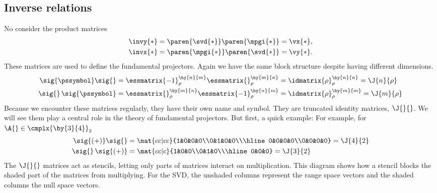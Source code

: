 \subsection{Inverse relations}
No consider the product matrices
\begin{equation}
  \begin{split}
    \invy{*} = \paren{ \svd{*} } \paren{ \mpgi{*} } = \vx{*},\\
    \invx{*} = \paren{ \mpgi{*} }\paren{ \svd{*} }  = \vy{*}.\\
  \end{split}
\end{equation}
These matrices are used to define the fundamental projectors. Again we have the same block structure despite having different dimensions.
\begin{equation}
  \begin{split}
  \sig{\pssymbol}\sig{} &= 
  \essmatrix{-1}^{\by{n}{m}}_{\rho} 
  \essmatrix{}^{\by{m}{n}}_{\rho} = 
  \idmatrix{\rho}^{\by{n}{n}}_{\rho} = \J{n}{\rho} \\
  \sig{}\,\sig{\pssymbol} &= 
  \essmatrix{}^{\by{m}{n}}_{\rho} 
  \essmatrix{-1}^{\by{n}{m}}_{\rho} = 
  \idmatrix{\rho}^{\by{m}{m}}_{\rho} = \J{m}{\rho}
  \end{split}
\end{equation}
Because we encounter these matrices regularly, they have their own name and symbol. They are truncated identity matrices, $\J{}{}$. We will see them play a central role in the theory of fundamental projectors. But first, a quick example:
For example, for $\A{}\in\cmplx{\by{3}{4}}_{2}$
\begin{equation}
  \begin{split}
  \sig{(+)}\sig{} &= 
  \mat{cc|cc}{1&0&0&0\\0&1&0&0\\\hline0&0&0&0\\0&0&0&0} = \J{4}{2} \\
  \sig{}\,\sig{(+)} &= 
  \mat{cc|c}{1&0&0\\0&1&0\\\hline0&0&0} = \J{3}{2}
  \end{split}
\end{equation}
The $\J{}{}$ matrices act as stencils, letting only parts of matrices interact on multiplication. This diagram shows how a stencil blocks the shaded part of the matrices from multiplying. For the SVD, the unshaded columns represent the range space vectors and the shaded columns the null space vectors.

